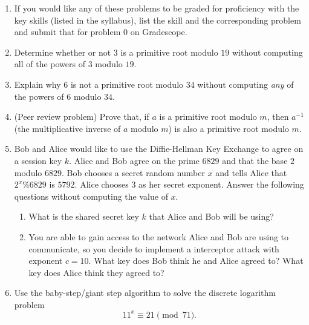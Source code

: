 \documentclass[12pt]{article}
\begin{document}
\begin{enumerate}
\item[0.] If you would like any of these problems to be graded for proficiency with the key skills (listed in the syllabus), list the skill and the corresponding problem and submit that for problem 0 on Gradescope. 
\item Determine whether or not $3$ is a primitive root modulo $19$ without computing all of the powers of $3$ modulo $19$. \\
 
 \item  Explain why $6$ is not a primitive root modulo $34$ without computing \emph{any} of the powers of $6$ modulo $34$. \\


\item (Peer review problem)  Prove that, if $a$ is a primitive root modulo $m$, then $a^{-1}$ (the multiplicative inverse of $a$ modulo $m$) is also a primitive root modulo $m$. \\

 \item Bob and Alice would like to use the Diffie-Hellman Key Exchange to agree on a session key $k$. Alice and Bob agree on the prime $6829$ and that the base $2$ modulo $6829$. Bob chooses a secret random number $x$ and tells Alice that $2^x\%6829$ is $5792$. Alice chooses $3$ as her secret exponent.  Answer the following questions without computing the value of $x$.  
\begin{enumerate}
\item What is the shared secret key $k$ that Alice and Bob will be using? 
\item You are able to gain access to the network Alice and Bob are using to communicate, so you decide to implement a interceptor attack with exponent $c=10$. What key does Bob think he and Alice agreed to? What key does Alice think they agreed to?
\end{enumerate}	

\item Use the baby-step/giant step algorithm to solve the discrete logarithm problem $$11^x\equiv 21\pmod{71}.$$

\end{enumerate}
\end{document}
